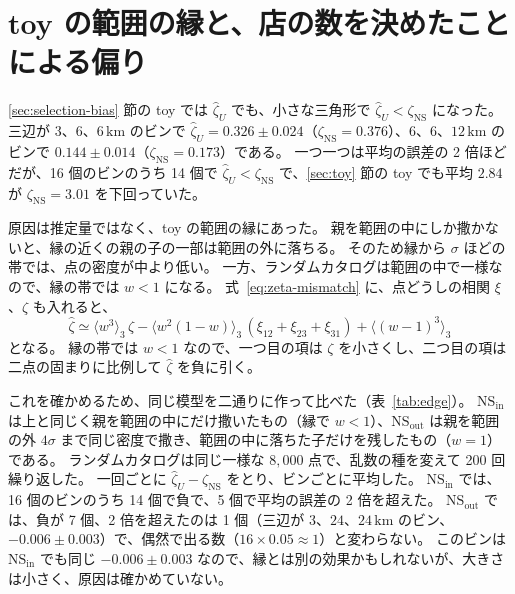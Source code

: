 \documentclass[a4paper,11pt]{ltjsarticle}
\begin{document}



\appendix

\section{toy の範囲の縁と、店の数を決めたことによる偏り}
\label{app:edge}

\ref{sec:selection-bias} 節の toy では $\hat\zeta_U$ でも、小さな三角形で $\hat\zeta_U < \zeta_{\mathrm{NS}}$ になった。
三辺が $3$、$6$、$6\,\mathrm{km}$ のビンで $\hat\zeta_U = 0.326 \pm 0.024$（$\zeta_{\mathrm{NS}} = 0.376$）、$6$、$6$、$12\,\mathrm{km}$ のビンで $0.144 \pm 0.014$（$\zeta_{\mathrm{NS}} = 0.173$）である。
一つ一つは平均の誤差の 2 倍ほどだが、16 個のビンのうち 14 個で $\hat\zeta_U < \zeta_{\mathrm{NS}}$ で、\ref{sec:toy} 節の toy でも平均 $2.84$ が $\zeta_{\mathrm{NS}} = 3.01$ を下回っていた。

原因は推定量ではなく、toy の範囲の縁にあった。
親を範囲の中にしか撒かないと、縁の近くの親の子の一部は範囲の外に落ちる。
そのため縁から $\sigma$ ほどの帯では、点の密度が中より低い。
一方、ランダムカタログは範囲の中で一様なので、縁の帯では $w < 1$ になる。
式~\eqref{eq:zeta-mismatch} に、点どうしの相関 $\xi$、$\zeta$ も入れると、
\begin{equation}
  \hat\zeta \simeq \langle w^3 \rangle_3\, \zeta - \langle w^2 (1 - w) \rangle_3\, (\xi_{12} + \xi_{23} + \xi_{31}) + \langle (w - 1)^3 \rangle_3
  \label{eq:zeta-edge}
\end{equation}
となる。
縁の帯では $w < 1$ なので、一つ目の項は $\zeta$ を小さくし、二つ目の項は二点の固まりに比例して $\hat\zeta$ を負に引く。

これを確かめるため、同じ模型を二通りに作って比べた（表~\ref{tab:edge}）。
$\mathrm{NS}_{\mathrm{in}}$ は上と同じく親を範囲の中にだけ撒いたもの（縁で $w < 1$）、$\mathrm{NS}_{\mathrm{out}}$ は親を範囲の外 $4\sigma$ まで同じ密度で撒き、範囲の中に落ちた子だけを残したもの（$w = 1$）である。
ランダムカタログは同じ一様な $8{,}000$ 点で、乱数の種を変えて 200 回繰り返した。
一回ごとに $\hat\zeta_U - \zeta_{\mathrm{NS}}$ をとり、ビンごとに平均した。
$\mathrm{NS}_{\mathrm{in}}$ では、16 個のビンのうち 14 個で負で、5 個で平均の誤差の 2 倍を超えた。
$\mathrm{NS}_{\mathrm{out}}$ では、負が 7 個、2 倍を超えたのは 1 個（三辺が $3$、$24$、$24\,\mathrm{km}$ のビン、$-0.006 \pm 0.003$）で、偶然で出る数（$16 \times 0.05 \approx 1$）と変わらない。
このビンは $\mathrm{NS}_{\mathrm{in}}$ でも同じ $-0.006 \pm 0.003$ なので、縁とは別の効果かもしれないが、大きさは小さく、原因は確かめていない。
\end{document}
